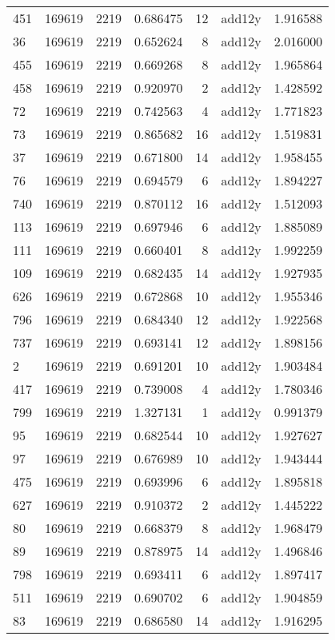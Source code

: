 \begin{tabular}{lrrrrlr}
451 & 169619 & 2219 & 0.686475 & 12 & add12y & 1.916588 \\
36 & 169619 & 2219 & 0.652624 & 8 & add12y & 2.016000 \\
455 & 169619 & 2219 & 0.669268 & 8 & add12y & 1.965864 \\
458 & 169619 & 2219 & 0.920970 & 2 & add12y & 1.428592 \\
72 & 169619 & 2219 & 0.742563 & 4 & add12y & 1.771823 \\
73 & 169619 & 2219 & 0.865682 & 16 & add12y & 1.519831 \\
37 & 169619 & 2219 & 0.671800 & 14 & add12y & 1.958455 \\
76 & 169619 & 2219 & 0.694579 & 6 & add12y & 1.894227 \\
740 & 169619 & 2219 & 0.870112 & 16 & add12y & 1.512093 \\
113 & 169619 & 2219 & 0.697946 & 6 & add12y & 1.885089 \\
111 & 169619 & 2219 & 0.660401 & 8 & add12y & 1.992259 \\
109 & 169619 & 2219 & 0.682435 & 14 & add12y & 1.927935 \\
626 & 169619 & 2219 & 0.672868 & 10 & add12y & 1.955346 \\
796 & 169619 & 2219 & 0.684340 & 12 & add12y & 1.922568 \\
737 & 169619 & 2219 & 0.693141 & 12 & add12y & 1.898156 \\
2 & 169619 & 2219 & 0.691201 & 10 & add12y & 1.903484 \\
417 & 169619 & 2219 & 0.739008 & 4 & add12y & 1.780346 \\
799 & 169619 & 2219 & 1.327131 & 1 & add12y & 0.991379 \\
95 & 169619 & 2219 & 0.682544 & 10 & add12y & 1.927627 \\
97 & 169619 & 2219 & 0.676989 & 10 & add12y & 1.943444 \\
475 & 169619 & 2219 & 0.693996 & 6 & add12y & 1.895818 \\
627 & 169619 & 2219 & 0.910372 & 2 & add12y & 1.445222 \\
80 & 169619 & 2219 & 0.668379 & 8 & add12y & 1.968479 \\
89 & 169619 & 2219 & 0.878975 & 14 & add12y & 1.496846 \\
798 & 169619 & 2219 & 0.693411 & 6 & add12y & 1.897417 \\
511 & 169619 & 2219 & 0.690702 & 6 & add12y & 1.904859 \\
83 & 169619 & 2219 & 0.686580 & 14 & add12y & 1.916295 \\

\end{tabular}
